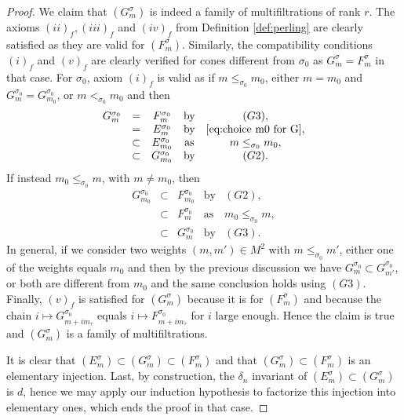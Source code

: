 \documentclass[a4paper,10pt]{amsart}
\theoremstyle{plain}{
    \newtheorem{theorem}{Theorem}[section]
    \newtheorem{lemma}[theorem]{Lemma}
    \newtheorem{corollary}[theorem]{Corollary}
    \newtheorem{proposition}[theorem]{Proposition}
    \newtheorem{conjecture}[theorem]{Conjecture}
}
\theoremstyle{definition}{
    \newtheorem{definition}[theorem]{Definition}
    \newtheorem{defn-thm}[theorem]{Definition-Theorem}
    \newtheorem{example}[theorem]{Example}
    \newtheorem{notation}[theorem]{Notation}
}
\theoremstyle{remark}{
    \newtheorem{remark}[theorem]{Remark}
    \newtheorem{problem}[theorem]{Problem}
    \newtheorem{question}[theorem]{Question}
}
\begin{document}
\begin{proof}
We claim that $(G^\sigma_m)$ is indeed a family of multifiltrations of rank $r$. The axioms $(ii)_f, (iii)_f$ and $(iv)_f$ from Definition \ref{def:perling} are clearly satisfied as they are valid for $(F^\sigma_m)$. Similarly, the compatibility conditions $(i)_f$ and $(v)_f$ are clearly verified for cones different from $\sigma_0$ as $G^\sigma_m=F^\sigma_m$ in that case. For $\sigma_0$, axiom $(i)_f$ is valid as if $m\leq_{\sigma_0} m_0$, either $m=m_0$ and $G_m^{\sigma_0}=G_{m_0}^{\sigma_0}$, or $m<_{\sigma_0} m_0$ and  then 
$$
\begin{array}{ccccc}
 G^{\sigma_0}_m & = &   F^{\sigma_0}_m & \mathrm{ by } & (G3),\\
                & = & E^{\sigma_0}_m & \mathrm{ by }&  \eqref{eq:choice m0 for G},\\
                & \subset & E^{\sigma_0}_{m_0}&  \mathrm{ as }& m\leq_{\sigma_0} m_0,\\
                & \subset & G_{m_0}^{\sigma_0}& \mathrm{ by }& (G2).
\end{array}
$$
If instead $m_0\leq_{\sigma_0} m$, with $m\neq m_0$, then
$$
\begin{array}{ccccc}
 G^{\sigma_0}_{m_0} & \subset &   F^{\sigma_0}_{m_0} & \mathrm{ by } & (G2),\\
                & \subset & F^{\sigma_0}_m &  \mathrm{ as }& m_0\leq_{\sigma_0} m,\\
                & \subset & G^{\sigma_0}_{m}&  \mathrm{ by }& (G3).
\end{array}
$$
In general, if we consider two weights $(m,m')\in M^2$ with $m\leq_{\sigma_0} m'$, either one of the weights equals $m_0$ and then by the previous discussion we have $G_m^{\sigma_0}\subset G_{m'}^{\sigma_0}$, or both are different from $m_0$ and the same conclusion holds using $(G3)$. Finally, $(v)_f$ is satisfied for $(G^\sigma_m)$ because it is for $(F^\sigma_m)$ and because the chain $i\mapsto G^{\sigma_0}_{m+im_\tau}$ equals $i\mapsto F^{\sigma_0}_{m+im_\tau}$ for $i$ large enough. Hence the claim is true and $(G^\sigma_m)$ is a family of multifiltrations. 

It is clear that $(E^\sigma_m)\subset (G^\sigma_m)\subset (F^\sigma_m)$ and that $(G^\sigma_m)\subset (F_m^\sigma)$ is an elementary injection. Last, by construction, the $\delta_n$ invariant of $(E^\sigma_m)\subset(G^\sigma_m)$ is $d$, hence we may apply our induction hypothesis to factorize this injection into elementary ones, which ends the proof in that case. 


\end{proof}
\end{document}
